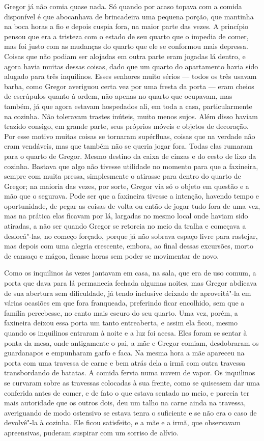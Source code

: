 Gregor já não comia quase nada. Só quando por acaso topava com a comida
disponível é que abocanhava de brincadeira uma pequena porção, que
mantinha na boca horas a fio e depois cuspia fora, na maior parte das
vezes. A princípio pensou que era a tristeza com o estado de seu quarto
que o impedia de comer, mas foi justo com as mudanças do quarto que ele se
conformou mais depressa. Coisas que não podiam ser alojadas em outra parte
eram jogadas lá dentro, e agora havia muitas dessas coisas, dado que um
quarto do apartamento havia sido alugado para três inquilinos. Esses
senhores muito sérios --- todos os três usavam barba, como Gregor averiguou
certa vez por uma fresta da porta --- eram cheios de escrúpulos quanto à
ordem, não apenas no quarto que ocupavam, mas também, já que agora estavam
hospedados ali, em toda a casa, particularmente na cozinha. Não toleravam
trastes inúteis, muito menos sujos. Além disso haviam trazido consigo, em
grande parte, seus próprios móveis e objetos de decoração. Por esse motivo
muitas coisas se tornaram supérfluas, coisas que na verdade não eram
vendáveis, mas que também não se queria jogar fora. Todas elas rumaram
para o quarto de Gregor. Mesmo destino da caixa de cinzas e do cesto de
lixo da cozinha. Bastava que algo não tivesse utilidade no momento para
que a faxineira, sempre com muita pressa, simplesmente o atirasse para
dentro do quarto de Gregor; na maioria das vezes, por sorte, Gregor via só
o objeto em questão e a mão que o segurava. Pode ser que a faxineira
tivesse a intenção, havendo tempo e oportunidade, de pegar as coisas de
volta ou então de jogar tudo fora de uma vez, mas na prática elas ficavam
por lá, largadas no mesmo local onde haviam sido atiradas, a não ser
quando Gregor se retorcia no meio da tralha e começava a deslocá"-las, no
começo forçado, porque já não sobrava espaço livre para rastejar, mas
depois com uma alegria crescente, embora, ao final dessas excursões, morto
de cansaço e mágoa, ficasse horas sem poder se movimentar de novo.

Como os inquilinos às vezes jantavam em casa, na sala, que era de uso
comum, a porta que dava para lá permanecia fechada algumas noites, mas
Gregor abdicava de sua abertura sem dificuldade, já tendo inclusive
deixado de aproveitá"-la em várias ocasiões em que fora franqueada,
preferindo ficar encolhido, sem que a família percebesse, no canto mais
escuro do seu quarto. Uma vez, porém, a faxineira deixou essa porta um
tanto entreaberta, e assim ela ficou, mesmo quando os inquilinos entraram
à noite e a luz foi acesa. Eles foram se sentar à ponta da mesa, onde
antigamente o pai, a mãe e Gregor comiam, desdobraram os guardanapos e
empunharam garfo e faca. Na mesma hora a mãe apareceu na porta com uma
travessa de carne e bem atrás dela a irmã com outra travessa transbordando
de batatas. A comida fervia numa nuvem de vapor. Os inquilinos se curvaram
sobre as travessas colocadas à sua frente, como se quisessem dar uma
conferida antes de comer, e de fato o que estava sentado no meio, e
parecia ter mais autoridade que os outros dois, deu um talho na carne
ainda na travessa, averiguando de modo ostensivo se estava tenra o
suficiente e se não era o caso de devolvê"-la à cozinha. Ele ficou
satisfeito, e a mãe e a irmã, que observavam apreensivas, puderam suspirar
com um sorriso de alívio.

